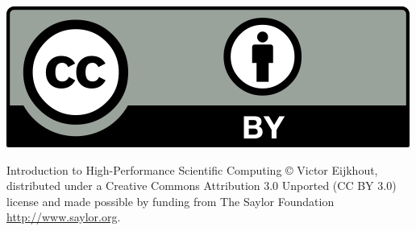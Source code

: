 \hbox{}\vfill\thispagestyle{empty}

\includegraphics{ccby}

Introduction to High-Performance Scientific Computing \copyright{}
Victor Eijkhout, distributed under a Creative Commons Attribution 3.0
Unported (CC BY 3.0) license and made possible by funding from
The Saylor Foundation \url{http://www.saylor.org}.

\hbox{}\vskip 2in \hbox{}
\pagebreak
